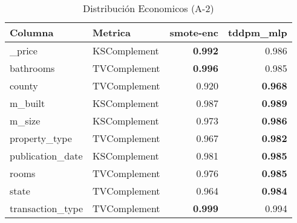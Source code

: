 \begin{table}[H]
\centering
\caption{Distribución Economicos (A-2)}
\label{table-shape-economicos-a-2}
\begin{tabular}{|l|l|r|r|}
\hline
\rowcolor[gray]{0.8}
Columna & Metrica & smote-enc & tddpm\_mlp \\
\hline \_price & KSComplement & \bfseries 0.992 & 0.986 \\
\hline bathrooms & TVComplement & \bfseries 0.996 & 0.985 \\
\hline county & TVComplement & 0.920 & \bfseries 0.968 \\
\hline m\_built & KSComplement & 0.987 & \bfseries 0.989 \\
\hline m\_size & KSComplement & 0.973 & \bfseries 0.986 \\
\hline property\_type & TVComplement & 0.967 & \bfseries 0.982 \\
\hline publication\_date & KSComplement & 0.981 & \bfseries 0.985 \\
\hline rooms & TVComplement & 0.976 & \bfseries 0.985 \\
\hline state & TVComplement & 0.964 & \bfseries 0.984 \\
\hline transaction\_type & TVComplement & \bfseries 0.999 & 0.994 \\
\hline
\end{tabular}
\end{table}
